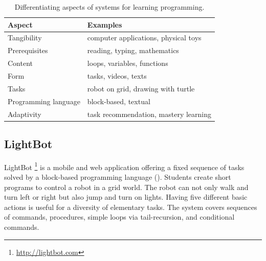 \begin{table}[htb]
\centering
\caption{Differentiating aspects of systems for learning programming.}
\begin{tabular}{l l}
\toprule
Aspect & Examples \\
\midrule
Tangibility & computer applications, physical toys \\
Prerequisites & reading, typing, mathematics \\
Content & loops, variables, functions \\
Form & tasks, videos, texts \\ %
Tasks & robot on grid, drawing with turtle \\
Programming language & block-based, textual \\
Adaptivity & task recommendation, mastery learning \\
\bottomrule
\end{tabular}
\label{tbl:existing-systems-categorization}
\end{table}





\subsection{LightBot}
\label{sec:lightbot}
LightBot%
\footnote{\url{http://lightbot.com}}
is a mobile and web application offering a fixed sequence of tasks solved by
a block-based programming language
().
Students create short programs to control a robot in a grid world.
The robot can not only walk and turn left or right but also jump and turn on lights.
Having five different basic actions is useful for a diversity of elementary tasks.
The system covers sequences of commands, procedures, simple loops via tail-recursion,
and conditional commands.

%


